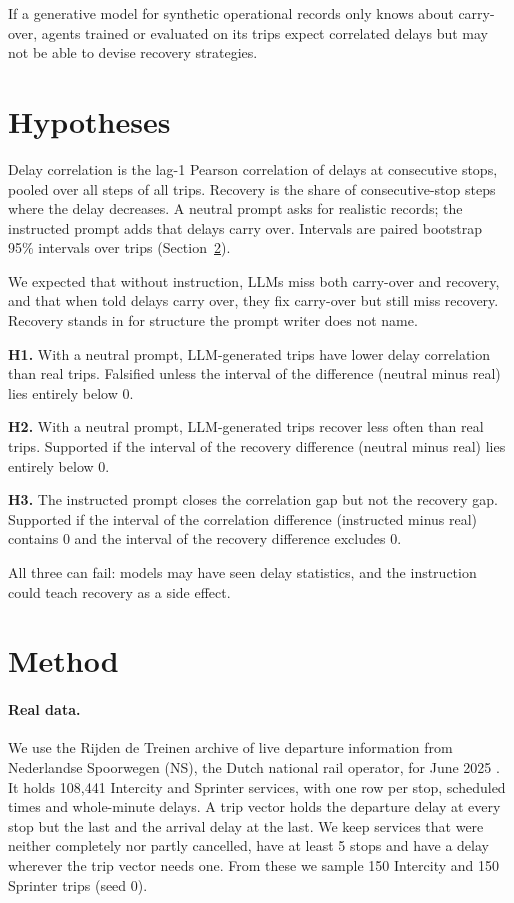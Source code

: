 \documentclass[11pt,a4paper]{article}
\begin{document}
If a generative model for synthetic operational records only knows about carry-over, agents trained or evaluated on its trips expect correlated delays but may not be able to devise recovery strategies. 

\section{Hypotheses}

Delay correlation is the lag-1 Pearson correlation of delays at consecutive stops, pooled over all steps of all trips. Recovery is the share of consecutive-stop steps where the delay decreases. A neutral prompt asks for realistic records; the instructed prompt adds that delays carry over. Intervals are paired bootstrap 95\% intervals over trips (Section~\ref{sec:method}).

We expected that without instruction, LLMs miss both carry-over and recovery, and that when told delays carry over, they fix carry-over but still miss recovery. Recovery stands in for structure the prompt writer does not name.

\textbf{H1.} With a neutral prompt, LLM-generated trips have lower delay correlation than real trips. Falsified unless the interval of the difference (neutral minus real) lies entirely below 0.

\textbf{H2.} With a neutral prompt, LLM-generated trips recover less often than real trips. Supported if the interval of the recovery difference (neutral minus real) lies entirely below 0.

\textbf{H3.} The instructed prompt closes the correlation gap but not the recovery gap. Supported if the interval of the correlation difference (instructed minus real) contains 0 and the interval of the recovery difference excludes 0.

All three can fail: models may have seen delay statistics, and the instruction could teach recovery as a side effect.

\section{Method}
\label{sec:method}

\paragraph{Real data.} We use the Rijden de Treinen archive of live departure information from Nederlandse Spoorwegen (NS), the Dutch national rail operator, for June 2025 \citep{rdt2025archive}. It holds 108{,}441 Intercity and Sprinter services, with one row per stop, scheduled times and whole-minute delays. A trip vector holds the departure delay at every stop but the last and the arrival delay at the last. We keep services that were neither completely nor partly cancelled, have at least 5 stops and have a delay wherever the trip vector needs one. From these we sample 150 Intercity and 150 Sprinter trips (seed 0).
\end{document}
